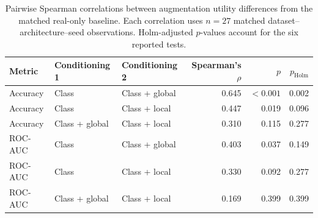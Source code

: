 \begin{table}[htbp]
\centering
\begin{tabular}{lllrrr}
\toprule
Metric & Conditioning 1 & Conditioning 2 & Spearman's $\rho$ & $p$ & $p_{\mathrm{Holm}}$ \\
\midrule
Accuracy & Class & Class + global & 0.645 & $<0.001$ & 0.002 \\
Accuracy & Class & Class + local & 0.447 & 0.019 & 0.096 \\
Accuracy & Class + global & Class + local & 0.310 & 0.115 & 0.277 \\
\midrule
ROC-AUC & Class & Class + global & 0.403 & 0.037 & 0.149 \\
ROC-AUC & Class & Class + local & 0.330 & 0.092 & 0.277 \\
ROC-AUC & Class + global & Class + local & 0.169 & 0.399 & 0.399 \\
\bottomrule
\end{tabular}
\caption{Pairwise Spearman correlations between augmentation utility differences from the matched real-only baseline. Each correlation uses $n=27$ matched dataset--architecture--seed observations. Holm-adjusted $p$-values account for the six reported tests.}
\label{tab:augmentation-conditioning-correlations}
\end{table}

